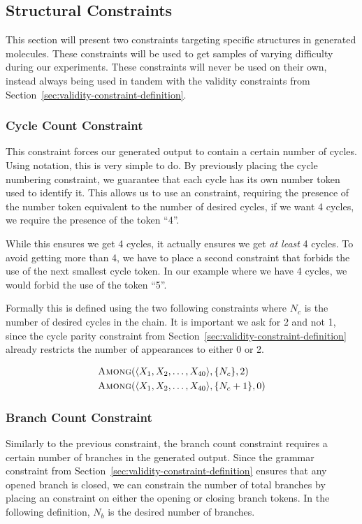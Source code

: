 \documentclass[../Document.tex]{subfiles}
\begin{document}
\subsection{Structural Constraints}
\label{sec:structural-constraints-definition}
This section will present two constraints targeting specific structures in generated molecules. These constraints will be used to get samples of varying difficulty during our experiments. These constraints will never be used on their own, instead always being used in tandem with the validity constraints from Section~\ref{sec:validity-constraint-definition}.

\subsubsection{Cycle Count Constraint}
This constraint forces our generated output to contain a certain number of cycles. 
Using \smiles notation, this is very simple to do.
By previously placing the cycle numbering constraint, we guarantee that each cycle has its own number token used to identify it.
This allows us to use an \among constraint, requiring the presence of the number token equivalent to the number of desired cycles, \eg if we want 4 cycles, we require the presence of the token ``4''.

While this ensures we get 4 cycles, it actually ensures we get \textit{at least} 4 cycles. To avoid getting more than 4, we have to place a second \among constraint that forbids the use of the next smallest cycle token. In our example where we have 4 cycles, we would forbid the use of the token ``5''.

Formally this is defined using the two following constraints where $N_c$ is the number of desired cycles in the chain. It is important we ask for 2 and not 1, since the cycle parity constraint from Section~\ref{sec:validity-constraint-definition} already restricts the number of appearances to either 0 or 2. 

\begin{align*}
    &\mbox{\sc Among}(\langle X_1, X_2, \ldots, X_{40} \rangle, \{N_c\}, 2)\\
    &\mbox{\sc Among}(\langle X_1, X_2, \ldots, X_{40} \rangle, \{N_c+1\}, 0)
\end{align*}


\subsubsection{Branch Count Constraint}
Similarly to the previous constraint, the branch count constraint requires a certain number of branches in the generated output. Since the grammar constraint from Section~\ref{sec:validity-constraint-definition} ensures that any opened branch is closed, we can constrain the number of total branches by placing an \among constraint on either the opening or closing branch tokens. In the following definition, $N_b$ is the desired number of branches.
\end{document}
